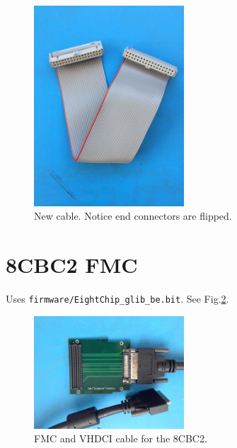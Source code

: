 \documentclass[11pt,a4paper]{article}
\begin{document}
\begin{figure} [htbp] 
		\centering
                \includegraphics[width=0.5\textwidth, angle = 270]{fig/NewCable.png}
                \caption{New cable. Notice end connectors are flipped.}
                \label{fig:NCable}
        \end{figure}
        
\clearpage

	\section{8CBC2 FMC}
	
	Uses \verb|firmware/EightChip_glib_be.bit|. See Fig.\ref{fig:EightFMC}.	
	
\begin{figure} [htbp] 
        \centering
                \includegraphics[width=0.5\textwidth]{fig/EightCableFMC.png}
                \caption{FMC and VHDCI cable for the 8CBC2.}
                \label{fig:EightFMC}
\end{figure}
        
	
\end{document}
